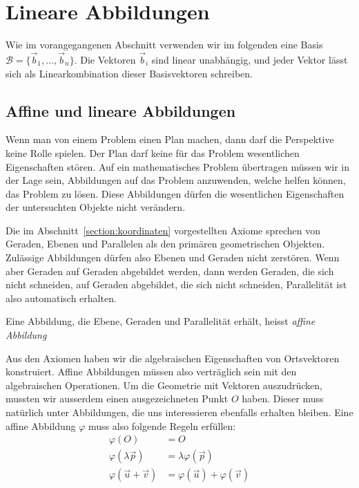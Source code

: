 %
%
%
\section{Lineare Abbildungen%
\label{section:lineare abbildungen}}
Wie im vorangegangenen Abschnitt verwenden wir im folgenden eine Basis
$\mathcal{B}=\{\vec{b}_1,\dots,\vec{b}_n\}$.
Die Vektoren $\vec{b}_i$
sind linear unabhängig, und jeder Vektor lässt sich als Linearkombination
dieser Basisvektoren schreiben.

%
%
\subsection{Affine und lineare Abbildungen}
Wenn man von einem Problem einen Plan machen, dann darf die Perspektive
keine Rolle spielen.
Der Plan darf keine für das Problem wesentlichen Eigenschaften stören.
Auf ein mathematisches Problem übertragen müssen wir in der Lage sein,
Abbildungen auf das Problem anzuwenden, welche helfen können, das
Problem zu lösen.
Diese Abbildungen dürfen die wesentlichen Eigenschaften der untersuchten
Objekte nicht verändern.

Die im Abschnitt~\ref{section:koordinaten} vorgestellten Axiome
sprechen von Geraden, Ebenen und Parallelen als den primären geometrischen
Objekten.
Zulässige Abbildungen dürfen also Ebenen und Geraden nicht zerstören.
Wenn aber Geraden auf Geraden abgebildet werden, dann werden Geraden,
die sich nicht schneiden, auf Geraden abgebildet, die sich nicht schneiden,
Parallelität ist also automatisch erhalten.

\begin{definition}
Eine Abbildung, die Ebene, Geraden und Parallelität erhält,
heisst {\em affine Abbildung}
\end{definition}

Aus den Axiomen haben wir die algebraischen Eigenschaften von Ortsvektoren
konstruiert.
Affine Abbildungen müssen also verträglich sein mit den algebraischen
Operationen.
Um die Geometrie mit Vektoren auszudrücken, mussten wir ausserdem
einen ausgezeichneten Punkt $O$ haben.
Dieser muss natürlich unter Abbildungen, die uns interessieren
ebenfalls erhalten bleiben.
Eine affine Abbildung $\varphi$ muss also folgende Regeln erfüllen:
\begin{align*}
\varphi(O)&=O
\\
\varphi(\lambda\vec{p})&=\lambda\varphi(\vec{p})
\\
\varphi(\vec{u}+\vec{v})&=\varphi(\vec{u}) + \varphi(\vec{v})
\end{align*}

